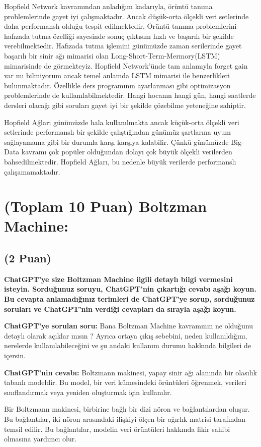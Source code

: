 \documentclass[11pt]{article}
\begin{document}
Hopfield Network kavramından anladığım kadarıyla, örüntü tanıma problemlerinde gayet iyi çalışmaktadır. Ancak düşük-orta ölçekli veri setlerinde daha performanslı olduğu tespit edilmektedir. Örüntü tanıma problemlerini hafızada tutma özelliği sayesinde sonuç çıktısını hızlı ve başarılı bir şekilde verebilmektedir. Hafızada tutma işlemini günümüzde zaman serilerinde gayet başarılı bir sinir ağı mimarisi olan Long-Short-Term-Mermory(LSTM) mimarisinde de görmekteyiz. Hopfield Network'ünde tam anlamıyla forget gain var mı bilmiyorum ancak temel anlamda LSTM mimarisi ile benzerlikleri bulunmaktadır. Özellikle ders programının ayarlanması gibi optimizasyon problemlerinde de kullanılabilmektedir. Hangi hocanın hangi gün, hangi saatlerde dersleri olacağı gibi soruları gayet iyi bir şekilde çözebilme yeteneğine sahiptir. 

Hopfield Ağları günümüzde hala kullanılmakta ancak küçük-orta ölçekli veri setlerinde performanslı bir şekilde çalıştığından günümüz şartlarına uyum sağlayamama gibi bir durumla karşı karşıya kalabilir. Çünkü günümüzde Big-Data kavramı çok popüler olduğundan dolayı çok büyük ölçekli verilerden bahsedilmektedir. Hopfield Ağları, bu nedenle büyük verilerde performanslı çalışamamaktadır.

\section{(Toplam 10 Puan) Boltzman Machine:}

\subsection{(2 Puan)} \textbf{ChatGPT’ye size Boltzman Machine ilgili detaylı bilgi vermesini isteyin. Sorduğunuz soruyu, ChatGPT'nin çıkartığı cevabı aşağı koyun. Bu cevapta anlamadığınız terimleri de ChatGPT’ye sorup, sorduğunuz soruları ve ChatGPT’nin verdiği cevapları da sırayla aşağı koyun.}

\textbf{ChatGPT'ye sorulan soru: } Bana Boltzman Machine kavramının ne olduğunu detaylı olarak açıklar mısın ? Ayrıca ortaya çıkış sebebini, neden kullanıldığını, nerelerde kullanılabileceğini ve şu andaki kullanım durumu hakkında bilgileri de içersin.

\textbf{ChatGPT'nin cevabı: } Boltzmann makinesi, yapay sinir ağı alanında bir olasılık tabanlı modeldir. Bu model, bir veri kümesindeki örüntüleri öğrenmek, verileri sınıflandırmak veya yeniden oluşturmak için kullanılır.

Bir Boltzmann makinesi, birbirine bağlı bir dizi nöron ve bağlantılardan oluşur. Bu bağlantılar, iki nöron arasındaki ilişkiyi ölçen bir ağırlık matrisi tarafından temsil edilir. Bu bağlantılar, modelin veri örüntüleri hakkında fikir sahibi olmasına yardımcı olur.
\end{document}
